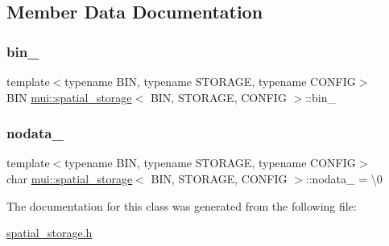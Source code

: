 \subsection{Member Data Documentation}
\mbox{\label{classmui_1_1spatial__storage_a970ace1beac9f2b4f7b1a6a19fc5c683}} 
\subsubsection{\texorpdfstring{bin\+\_\+}{bin\_}}
{\footnotesize\ttfamily template$<$typename B\+IN, typename S\+T\+O\+R\+A\+GE, typename C\+O\+N\+F\+IG$>$ \\
B\+IN \hyperlink{classmui_1_1spatial__storage}{mui\+::spatial\+\_\+storage}$<$ B\+IN, S\+T\+O\+R\+A\+GE, C\+O\+N\+F\+IG $>$\+::bin\+\_\+}

\mbox{\label{classmui_1_1spatial__storage_a438f755b7a9e99a581554dbd58e07716}} 
\subsubsection{\texorpdfstring{nodata\+\_\+}{nodata\_}}
{\footnotesize\ttfamily template$<$typename B\+IN, typename S\+T\+O\+R\+A\+GE, typename C\+O\+N\+F\+IG$>$ \\
char \hyperlink{classmui_1_1spatial__storage}{mui\+::spatial\+\_\+storage}$<$ B\+IN, S\+T\+O\+R\+A\+GE, C\+O\+N\+F\+IG $>$\+::nodata\+\_\+ = \textquotesingle{}\textbackslash{}0\textquotesingle{}}



The documentation for this class was generated from the following file\+:\begin{DoxyCompactItemize}
\item 
\hyperlink{spatial__storage_8h}{spatial\+\_\+storage.\+h}\end{DoxyCompactItemize}
